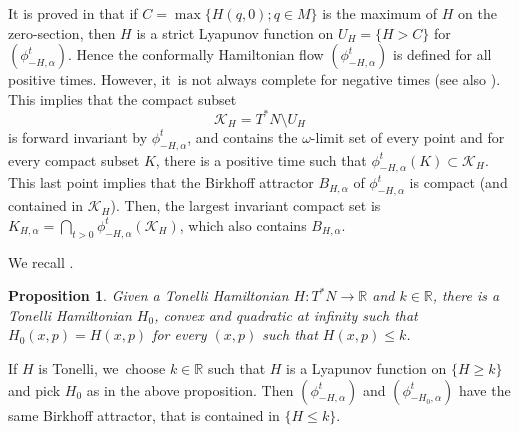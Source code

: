 \documentclass[JEP,XML,SOM,Unicode,NoFloatCountersInSection,published]{cedram}
\newtheorem{prop}[thm]{Proposition}
\theoremstyle{definition}
\newcommand{\R}{\mathbb{R}}
\begin{document}
It is proved in \cite{ArnaudSuZavidovique} that if $C=\max\{H(q, 0); q\in M\}$ is the maximum of $H$ on the zero-section, then $H$ is a strict Lyapunov function on $U_H=\{ H>C\}$ for $(\phi_{-H, \alpha}^t)$. Hence the conformally Hamiltonian flow $(\phi^t_{-H, \alpha})$ is defined for all positive times. However, it~is not always complete for negative times (see also \cite{MaroSor2017}).
This implies that the compact subset\vspace*{-3pt}\enlargethispage{.5\baselineskip}
\begin{equation}\label{EKH}
\mathcal K_H=T^*N\setminus U_H
\end{equation}
is forward invariant by $\phi_{-H,\alpha}^t$, and contains the $\omega$-limit set of every point and for every compact subset $K$, there is a positive time such that $\phi^t_{-H, \alpha}(K)\subset \mathcal K_H$. This last point implies that the Birkhoff attractor $B_{H, \alpha}$ of $\phi_{-H,\alpha}^t$ is compact (and contained in $\mathcal K_H$). Then, the largest invariant compact set is $K_{H,\alpha}=\bigcap_{t>0}\phi^t_{-H, \alpha}(\mathcal K_H)$, which also contains $B_{H, \alpha}$.

We recall \cite[Prop.\,18]{CIPP}.

\begin{prop} Given a Tonelli Hamiltonian $H:T^*N\to\R$ and $k\in\R$, there is a Tonelli Hamiltonian $H_0$, convex and quadratic at infinity such that $H_0(x,p) = H(x, p)$ for every $(x, p)$ such that $H(x, p) \leq k$.
\end{prop}

If $H$ is Tonelli, we~choose $k\in \R$ such that $H$ is a Lyapunov function on $\{ H\geq k\}$ and pick $H_0$ as in the above proposition. Then $(\phi^t_{-H, \alpha})$ and $(\phi^t_{-H_0, \alpha})$ have the same Birkhoff attractor, that is contained in $\{ H\leq k\}$.
\end{document}
